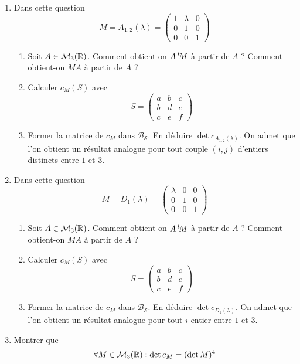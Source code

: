 \begin{enumerate}
\item Dans cette question 
\begin{displaymath}
 M = A_{1,2}(\lambda)=
\begin{pmatrix}
 1 & \lambda & 0 \\ 0 & 1 & 0 \\ 0 & 0 & 1 
\end{pmatrix}
\end{displaymath}
\begin{enumerate}
 \item Soit $A\in \mathcal M_3(\mathbb{R})$. Comment obtient-on $A \,\mathstrut^t\! M$ à partir de $A$ ? Comment obtient-on $MA$ à partir de $A$ ?
\item Calculer $c_M(S)$ avec 
\begin{displaymath}
 S =
\begin{pmatrix}
 a & b & c \\ b & d & e \\ c & e & f
\end{pmatrix}
\end{displaymath}
\item Former la matrice de $c_M$ dans $\mathcal B_{\mathcal S}$. En déduire $\det c_{A_{1,2}(\lambda)}$.
\newline
On admet que l'on obtient un résultat analogue pour tout couple $(i,j)$ d'entiers distincts entre $1$ et $3$.
\end{enumerate}

\item Dans cette question 
\begin{displaymath}
 M = D_{1}(\lambda)=
\begin{pmatrix}
 \lambda & 0 & 0 \\ 0 & 1 & 0 \\ 0 & 0 & 1 
\end{pmatrix}
\end{displaymath}
\begin{enumerate}
 \item Soit $A\in \mathcal M_3(\mathbb{R})$. Comment obtient-on $A \,\mathstrut^t\! M$ à partir de $A$ ? Comment obtient-on $MA$ à partir de $A$ ?
\item Calculer $c_M(S)$ avec 
\begin{displaymath}
 S =
\begin{pmatrix}
 a & b & c \\ b & d & e \\ c & e & f
\end{pmatrix}
\end{displaymath}
\item Former la matrice de $c_M$ dans $\mathcal B_{\mathcal S}$. En déduire $\det c_{D_{1}(\lambda)}$.
\newline
On admet que l'on obtient un résultat analogue pour tout $i$ entier entre $1$ et $3$.
\end{enumerate}

\item Montrer que 
\begin{displaymath}
 \forall M \in \mathcal M_3(\mathbb{R}) : \det c_M = (\det M)^4
\end{displaymath}

\end{enumerate}


